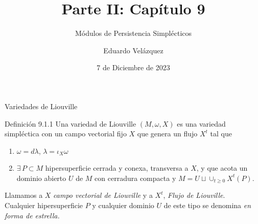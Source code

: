 \documentclass{beamer}
\date{7 de Diciembre de 2023}%
\title{Parte II: Cap\'itulo 9}
\subtitle{M\'odulos de Persistencia Simpl\'ecticos\\ \scalebox{0.6}{\emph{(Symplectic persistence modules)}}}
\author{Eduardo Vel\'azquez}
\begin{document}
\frenchspacing


  \frame{\maketitle}


%
\begin{frame}{Variedades de Liouville}{}
\begin{block}{Definici\'on 9.1.1} Una variedad de Liouville $(M,\omega,X)$ es una variedad simpl\'ectica con un campo vectorial fijo $X$ que genera un flujo $X^t$ tal que
\begin{enumerate}
\item $\omega = d\lambda$, $\lambda=\iota_X\omega$
\item $\exists \, P\subset M$ hipersuperficie cerrada y conexa, transversa a $X$, y que acota un dominio abierto $U$ de $M$ con cerradura compacta y $M=U\sqcup\cup_{t\geq 0}X^t(P).$
\end{enumerate}
Llamamos a $X$ \emph{campo vectorial de Liouville} y a $X^t$, \emph{Flujo de Liouville}.\\
Cualquier hipersuperficie $P$ y cualquier dominio $U$ de este tipo se denomina \emph{en forma de estrella.}
\end{block}
\end{frame}
\end{document}
